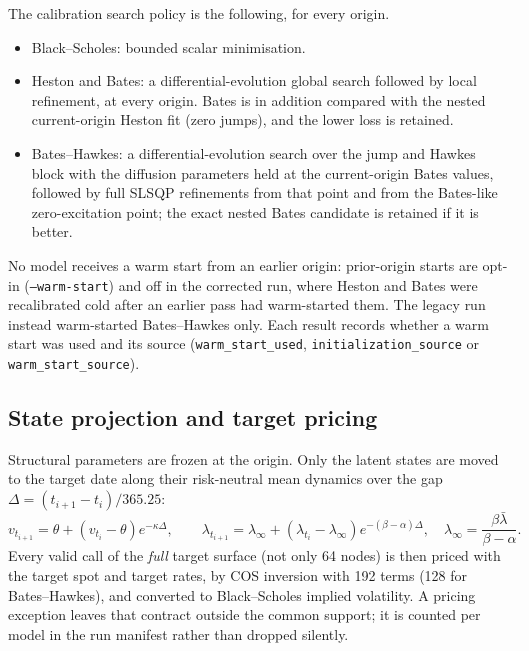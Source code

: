 The calibration search policy is the following, for every origin.
\begin{itemize}
    \item Black--Scholes: bounded scalar minimisation.
    \item Heston and Bates: a differential-evolution global search followed by
    local refinement, at every origin.  Bates is in addition compared with the
    nested current-origin Heston fit (zero jumps), and the lower loss is
    retained.
    \item Bates--Hawkes: a differential-evolution search over the jump and
    Hawkes block with the diffusion parameters held at the current-origin
    Bates values, followed by full SLSQP refinements from that point and from
    the Bates-like zero-excitation point; the exact nested Bates candidate is
    retained if it is better.
\end{itemize}
No model receives a warm start from an earlier origin: prior-origin starts are
opt-in (\texttt{--warm-start}) and off in the corrected run, where Heston and
Bates were recalibrated cold after an earlier pass had warm-started them.  The
legacy run instead warm-started Bates--Hawkes only.  Each result records
whether a warm start was used and its source (\texttt{warm\_start\_used},
\texttt{initialization\_source} or \texttt{warm\_start\_source}).

\subsection{State projection and target pricing}
\label{subsec:oos_projection}

Structural parameters are frozen at the origin.  Only the latent states are
moved to the target date along their risk-neutral mean dynamics over the gap
$\Delta = (t_{i+1}-t_i)/365.25$:
\begin{equation}
    v_{t_{i+1}} = \theta + (v_{t_i}-\theta)e^{-\kappa\Delta},
    \qquad
    \lambda_{t_{i+1}} = \lambda_\infty + (\lambda_{t_i}-\lambda_\infty)
    e^{-(\beta-\alpha)\Delta},
    \quad
    \lambda_\infty = \frac{\beta\bar{\lambda}}{\beta-\alpha}.
\end{equation}
Every valid call of the \emph{full} target surface (not only 64 nodes) is
then priced with the target spot and target rates, by COS inversion with 192
terms (128 for Bates--Hawkes), and converted to Black--Scholes implied
volatility.  A pricing exception leaves that contract outside the common
support; it is counted per model in the run manifest rather than dropped
silently.

